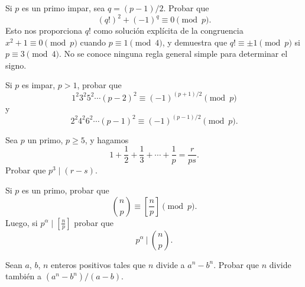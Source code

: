 \documentclass[12pt,a4paper]{book}
\begin{document}
    \begin{ejercicio}
        Si $p$ es un primo impar, sea $q=(p-1)/2$. Probar que
        \begin{equation*}
            (q!)^{2}+(-1)^{q}\equiv0\pmod{p}.
        \end{equation*}
        Esto nos proporciona $q!$ como solución explícita de la congruencia
        $x^{2}+1\equiv0\pmod{p}$ cuando $p\equiv1\pmod{4}$, y demuestra que
        $q!\equiv\pm1\pmod{p}$ si $p\equiv3\pmod{4}$. No se conoce ninguna regla general
        simple para determinar el signo.
    \end{ejercicio}

    \begin{ejercicio}
        Si $p$ es impar, $p>1$, probar que
        \begin{equation*}
            1^{2}3^{2}5^{2}\cdots(p-2)^{2}\equiv(-1)^{(p+1)/2}\pmod{p}
        \end{equation*}
        y
        \begin{equation*}
            2^{2}4^{2}6^{2}\cdots(p-1)^{2}\equiv(-1)^{(p-1)/2}\pmod{p}.
        \end{equation*}
    \end{ejercicio}

    \begin{ejercicio}
        Sea $p$ un primo, $p\geq5$, y hagamos
        \begin{equation*}
            1+\frac{1}{2}+\frac{1}{3}+\cdots+\frac{1}{p}=\frac{r}{ps}.
        \end{equation*}
        Probar que $p^{3}\mid(r-s)$.
    \end{ejercicio}

    \begin{ejercicio}
        Si $p$ es un primo, probar que
        \begin{equation*}
            \binom{n}{p}\equiv\left[\frac{n}{p}\right]\pmod{p}.
        \end{equation*}
        Luego, si $p^{\alpha}\mid\left[\frac{n}{p}\right]$ probar que
        \begin{equation*}
            p^{\alpha}\ \bigg|\ \binom{n}{p}.
        \end{equation*}
    \end{ejercicio}

    \begin{ejercicio}
        Sean $a$, $b$, $n$ enteros positivos tales que $n$ divide a $a^{n}-b^{n}$. Probar que
        $n$ divide también a $(a^{n}-b^{n})/(a-b)$.
    \end{ejercicio}
\end{document}
